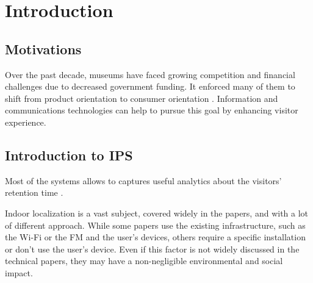 \chapter{Introduction}

\section{Motivations}





Over the past decade, museums have faced growing competition and financial challenges due to decreased government funding. It enforced many of them to shift from product orientation to consumer orientation  \cite{chiappa_emotions_2014}. Information and communications technologies can help to pursue this goal by enhancing visitor experience.


\section{Introduction to IPS}


Most of the systems allows to captures useful analytics about the visitors' retention time \cite{spachos_ble_2020}.

Indoor localization is a vast subject, covered widely in the papers, and with a lot of different approach. While some papers use the existing infrastructure, such as the Wi-Fi or the FM and the user's devices, others require a specific installation or don't use the user's device. Even if this factor is not widely discussed in the technical papers, they may have a non-negligible environmental and social impact.

